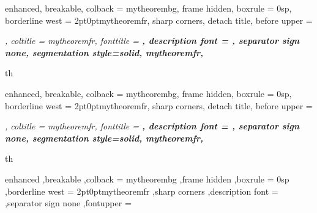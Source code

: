 \makeatletter
\newcommand\RedeclareMathOperator{%
	\@ifstar{\def\rmo@s{m}\rmo@redeclare}{\def\rmo@s{o}\rmo@redeclare}%
}
\newcommand\rmo@redeclare[2]{%
	\begingroup \escapechar\m@ne\xdef\@gtempa{{\string#1}}\endgroup
	\expandafter\@ifundefined\@gtempa
	{\@latex@error{\noexpand#1undefined}\@ehc}%
	\relax
	\expandafter\rmo@declmathop\rmo@s{#1}{#2}}
\newcommand\rmo@declmathop[3]{%
	\DeclareRobustCommand{#2}{\qopname\newmcodes@#1{#3}}%
}
\@onlypreamble\RedeclareMathOperator
\makeatother


\setlength{\parindent}{1cm}

{%
	enhanced,
	breakable,
	colback = mytheorembg,
	frame hidden,
	boxrule = 0sp,
	borderline west = {2pt}{0pt}{mytheoremfr},
	sharp corners,
	detach title,
	before upper = \tcbtitle\par\smallskip\noindent\itshape\setlength{\parindent}{1.5em},
	coltitle = mytheoremfr,
	fonttitle = \bfseries\sffamily,
	description font = \mdseries,
	separator sign none,
	segmentation style={solid, mytheoremfr},
}
{th}

{%
	enhanced,
	breakable,
	colback = mytheorembg,
	frame hidden,
	boxrule = 0sp,
	borderline west = {2pt}{0pt}{mytheoremfr},
	sharp corners,
	detach title,
	before upper = \tcbtitle\par\smallskip\noindent\itshape\setlength{\parindent}{1.5em},
	coltitle = mytheoremfr,
	fonttitle = \bfseries\sffamily,
	description font = \mdseries,
	separator sign none,
	segmentation style={solid, mytheoremfr},
}
{th}

{%
	enhanced
	,breakable
	,colback = mytheorembg
	,frame hidden
	,boxrule = 0sp
	,borderline west = {2pt}{0pt}{mytheoremfr}
	,sharp corners
	,description font = \mdseries
	,separator sign none
	,fontupper = \itshape
}

